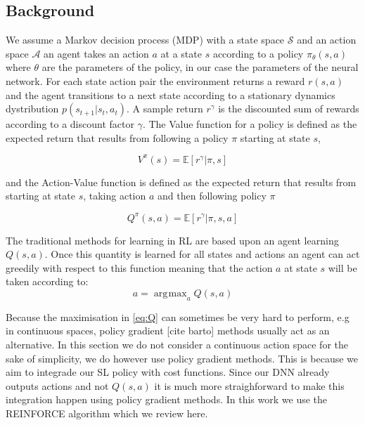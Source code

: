 \documentclass[a4paper,11pt]{report}
\DeclareMathOperator*{\argmax}{\arg\!\max}
\begin{document}
\subsection{Background}\label{sec:pg_background}

We assume a Markov decision process (MDP) with a state space $\mathcal{S}$ and an action space $\mathcal{A}$ an agent takes an action $a$ at a state $s$ according to a policy $\pi_\theta(s,a)$ where $\theta$ are the parameters of the policy, in our case the parameters of the neural network. For each state action pair the environment returns a reward $r(s,a)$ and the agent transitions to a next state according to a stationary dynamics dystribution $p(s_{t+1}|s_t,a_t)$. A sample return $r^{\gamma}$ is the discounted sum of rewards according to a discount factor $\gamma$. The Value function for a policy is defined as the expected return that results from following a policy $\pi$ starting at state $s$,


\begin{equation}
	V^{\pi}(s) = \mathbb{E}[r^{\gamma}|\pi,s]
\end{equation}

and the Action-Value function is defined as the expected return that results from starting at state $s$, taking action $a$ and then following policy $\pi$

\begin{equation}
	Q^{\pi}(s,a) = \mathbb{E}[r^{\gamma}|\pi,s,a]
\end{equation}


The traditional methods for learning in RL are based upon an agent learning $Q(s,a)$. Once this quantity is learned for all states and actions an agent can act greedily with respect to this function meaning that the action $a$ at state $s$ will be taken according to:
\begin{equation}
	a = \argmax_a Q(s,a) \label{eq:Q}
\end{equation}

Because the maximisation in \ref{eq:Q} can sometimes be very hard to perform, e.g in continuous spaces, policy gradient [cite barto] methods usually act as an alternative. In this section we do not consider a continuous action space for the sake of simplicity, we do however use policy gradient methods. This is because we aim to integrade our SL policy with cost functions. Since our DNN already outputs actions and not $Q(s,a)$ it is much more straighforward to make this integration happen using policy gradient methods. In this work we use the REINFORCE algorithm \cite{williams1992simple} which we review here. 
\end{document}
